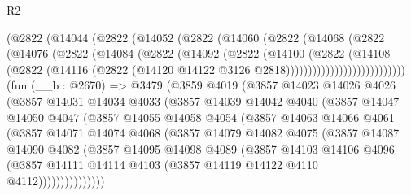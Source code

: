 \begin{lexlean}{R2}
\begin{coremodule}
              (@2822
                (@14044
                  (@2822
                    (@14052
                      (@2822
                        (@14060
                          (@2822
                            (@14068
                              (@2822
                                (@14076
                                  (@2822
                                    (@14084
                                      (@2822
                                        (@14092
                                          (@2822
                                            (@14100
                                              (@2822
                                                (@14108
                                                  (@2822
                                                    (@14116
                                                      (@2822
                                                        (@14120
                                                          @14122
                                                          @3126
                                                          @2818)))))))))))))))))))))))))))
    (fun (__b : @2670) =>
    @3479
      (@3859
        @4019
        (@3857
          @14023
          @14026
          @4026
          (@3857
            @14031
            @14034
            @4033
            (@3857
              @14039
              @14042
              @4040
              (@3857
                @14047
                @14050
                @4047
                (@3857
                  @14055
                  @14058
                  @4054
                  (@3857
                    @14063
                    @14066
                    @4061
                    (@3857
                      @14071
                      @14074
                      @4068
                      (@3857
                        @14079
                        @14082
                        @4075
                        (@3857
                          @14087
                          @14090
                          @4082
                          (@3857
                            @14095
                            @14098
                            @4089
                            (@3857
                              @14103
                              @14106
                              @4096
                              (@3857
                                @14111
                                @14114
                                @4103
                                (@3857 @14119 @14122 @4110 @4112)))))))))))))))

\end{coremodule}
\end{lexlean}
